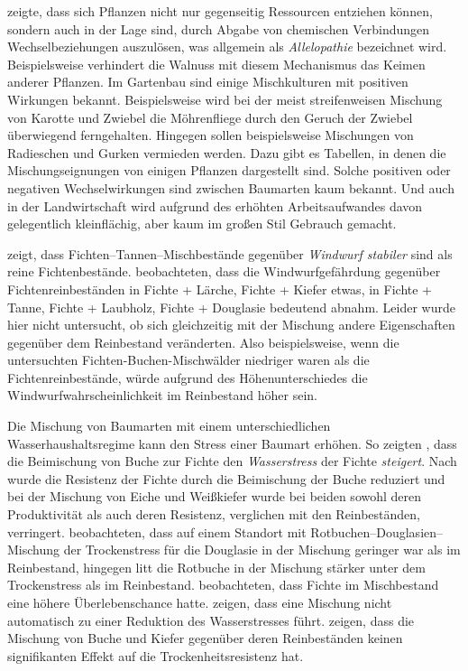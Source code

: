 \documentclass[twocolumn, paper=a4, fontsize=10pt, bibliography=totoc, index=totoc]{scrartcl}
\begin{document}
\citet{molisch1937allelopathie} zeigte, dass sich Pflanzen nicht nur gegenseitig
Ressourcen entziehen können, sondern auch in der Lage sind, durch Abgabe von
chemischen Verbindungen Wechselbeziehungen auszulösen, was allgemein als
\emph{Allelopathie} bezeichnet wird. Beispielsweise verhindert die Walnuss mit
diesem Mechanismus das Keimen anderer Pflanzen. Im Gartenbau sind einige
Mischkulturen mit positiven Wirkungen bekannt. Beispielsweise wird bei der
meist streifenweisen Mischung von Karotte und Zwiebel die Möhrenfliege durch
den Geruch der Zwiebel überwiegend ferngehalten. Hingegen sollen beispielsweise
Mischungen von Radieschen und Gurken vermieden werden. Dazu gibt es Tabellen, in
denen die Mischungseignungen von einigen Pflanzen dargestellt sind. Solche
positiven oder negativen Wechselwirkungen sind zwischen Baumarten kaum bekannt.
Und auch in der Landwirtschaft wird aufgrund des erhöhten Arbeitsaufwandes
davon gelegentlich kleinflächig, aber kaum im großen Stil Gebrauch gemacht.

\citet{schmidtVogt1987Sturmstabilitaet} zeigt, dass
Fichten--Tannen--Mischbestände gegenüber \emph{Windwurf stabiler} sind
als reine Fichtenbestände. \citet{schuetz2006stabilitaetMischbestand}
beobachteten, dass die Windwurfgefährdung gegenüber
Fichtenreinbeständen in Fichte + Lärche, Fichte + Kiefer etwas, in
Fichte + Tanne, Fichte + Laubholz, Fichte + Douglasie bedeutend
abnahm. Leider wurde hier nicht untersucht, ob sich gleichzeitig mit
der Mischung andere Eigenschaften gegenüber dem Reinbestand
veränderten. Also beispielsweise, wenn die untersuchten
Fichten-Buchen-Mischwälder niedriger waren als die
Fichtenreinbestände, würde aufgrund des Höhenunterschiedes die
Windwurfwahrscheinlichkeit im Reinbestand höher sein.

Die Mischung von Baumarten mit einem unterschiedlichen
Wasserhaushaltsregime kann den Stress einer Baumart erhöhen. So
zeigten \citet{schume2004wasserFichteBuche}, dass die Beimischung von
Buche zur Fichte den \emph{Wasserstress} der Fichte
\emph{steigert}. Nach \citet{nothdurft2020mischbestand} wurde die
Resistenz der Fichte durch die Beimischung der Buche reduziert und bei
der Mischung von Eiche und Weißkiefer wurde bei beiden sowohl deren
Produktivität als auch deren Resistenz, verglichen mit den
Reinbeständen, verringert. \citet{thurm2016mischungDougBuStress}
beobachteten, dass auf einem Standort mit
Rotbuchen--Douglasien--Mischung der Trockenstress für die Douglasie
in der Mischung geringer war als im Reinbestand, hingegen litt die
Rotbuche in der Mischung stärker unter dem Trockenstress als im
Reinbestand. \citet{neuner2015FichteAusfall} beobachteten, dass Fichte
im Mischbestand eine höhere Überlebenschance
hatte. \citet{schnabel2022mischwaldTrockenstress} zeigen, dass eine
Mischung nicht automatisch zu einer Reduktion des Wasserstresses führt.
\citet{streel2022Mischbestand} zeigen, dass die Mischung von Buche und Kiefer
gegenüber deren Reinbeständen keinen signifikanten Effekt auf die
Trockenheitsresistenz hat.
\end{document}
